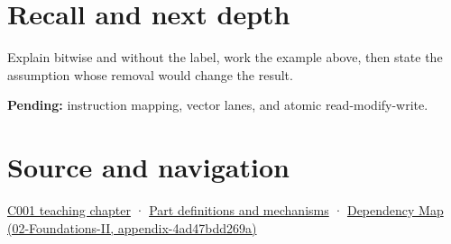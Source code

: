 \section{Recall and next depth}\label{appendix-68b52453737c-recall-and-next-depth}

Explain bitwise and without the label, work the example above, then state the assumption whose removal would change the result.

\textbf{Pending:} instruction mapping, vector lanes, and atomic read-modify-write.

\section{Source and navigation}\label{appendix-68b52453737c-source-and-navigation}

\href{Continuous\%20Notes/Computing\%20Foundations\%20-\%20From\%20Bits\%20to\%20C++\%20and\%20Systems\%20APIs\#From\%20a\%20signal\%20to\%20an\%20interpretation}{C001 teaching chapter} · \hyperref[appendix-fd090d982a15]{Part definitions and mechanisms} · \href{../02-Foundations-II/main.pdf\#nameddest=appendix-4ad47bdd269a}{Dependency Map (02-Foundations-II, appendix-4ad47bdd269a)}
